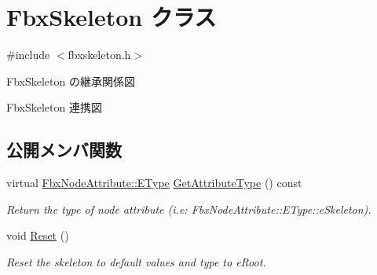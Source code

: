 \hypertarget{class_fbx_skeleton}{}\section{Fbx\+Skeleton クラス}
\label{class_fbx_skeleton}


{\ttfamily \#include $<$fbxskeleton.\+h$>$}



Fbx\+Skeleton の継承関係図


Fbx\+Skeleton 連携図
\subsection*{公開メンバ関数}
\begin{DoxyCompactItemize}
\item 
virtual \hyperlink{class_fbx_node_attribute_a08e1669d3d1a696910756ab17de56d6a}{Fbx\+Node\+Attribute\+::\+E\+Type} \hyperlink{class_fbx_skeleton_a3ff6cd0cae408860585d954b7249a4d9}{Get\+Attribute\+Type} () const
\begin{DoxyCompactList}\small\item\em Return the type of node attribute (i.\+e\+: Fbx\+Node\+Attribute\+::\+E\+Type\+::e\+Skeleton). \end{DoxyCompactList}\item 
void \hyperlink{class_fbx_skeleton_a622069fcb67d773d755e96b321df1094}{Reset} ()
\begin{DoxyCompactList}\small\item\em Reset the skeleton to default values and type to {\ttfamily e\+Root}. \end{DoxyCompactList}\end{DoxyCompactItemize}
